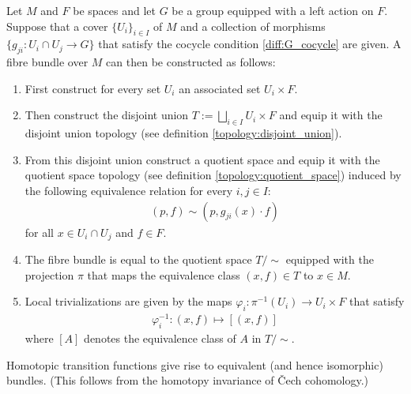     \begin{construct}\label{diff:fibre_bundle_construction_theorem}
        Let $M$ and $F$ be spaces and let $G$ be a group equipped with a left action on $F$. Suppose that a cover $\{U_i\}_{i\in I}$ of $M$ and a collection of morphisms $\{g_{ji}:U_i\cap U_j\rightarrow G\}$ that satisfy the cocycle condition \ref{diff:G_cocycle} are given. A fibre bundle over $M$ can then be constructed as follows:
        \begin{enumerate}
            \item First construct for every set $U_i$ an associated set $U_i\times F$.
            \item Then construct the disjoint union $T:=\bigsqcup_{i\in I}U_i\times F$ and equip it with the disjoint union topology (see definition \ref{topology:disjoint_union}).
            \item From this disjoint union construct a quotient space and equip it with the quotient space topology (see definition \ref{topology:quotient_space}) induced by the following equivalence relation for every $i,j\in I$:
                \begin{gather}
                    (p, f)\sim(p,g_{ji}(x)\cdot f)
                \end{gather}
                for all $x\in U_i\cap U_j$ and $f\in F$.
            \item The fibre bundle is equal to the quotient space $T/\sim$ equipped with the projection $\pi$ that maps the equivalence class $(x,f)\in T$ to $x\in M$.
            \item Local trivializations are given by the maps $\varphi_i:\pi^{-1}(U_i)\rightarrow U_i\times F$ that satisfy
                \begin{gather}
                    \varphi_i^{-1}:(x,f)\mapsto [(x,f)]
                \end{gather}
                where $[A]$ denotes the equivalence class of $A$ in $T/\sim$.
        \end{enumerate}
    \end{construct}
    \begin{property}
        Homotopic transition functions give rise to equivalent (and hence isomorphic) bundles. (This follows from the homotopy invariance of \v{C}ech cohomology.)
    \end{property}

